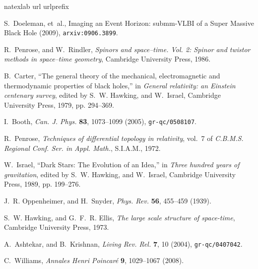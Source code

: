 \documentclass[
%
draft    %
,numberedheadings 
,bibliocites
  ]
  {aipproc}
\begin{document}
\begin{thebibliography}{57}
\expandafter\ifx\csname natexlab\endcsname\relax\def\natexlab#1{#1}\fi
\providecommand{\enquote}[1]{``#1''}
\expandafter\ifx\csname url\endcsname\relax
  \def\url#1{\texttt{#1}}\fi
\expandafter\ifx\csname urlprefix\endcsname\relax\def\urlprefix{URL }\fi
\providecommand{\eprint}[2][]{\url{#2}}

S.~Doeleman, et~al., {Imaging an Event Horizon: submm-VLBI of a Super Massive
  Black Hole} (2009), \eprint{arxiv:0906.3899}.

R.~Penrose, and W.~Rindler, \emph{{Spinors and space--time. Vol. 2: Spinor and
  twistor methods in space--time geometry}}, Cambridge University Press, 1986.

B.~Carter, \enquote{The general theory of the mechanical, electromagnetic and
  thermodynamic properties of black holes,} in \emph{General relativity: an
  Einstein centenary survey}, edited by S.~W. Hawking, and W.~Israel, Cambridge
  University Press, 1979, pp. 294--369.

I.~Booth, \emph{Can. J. Phys.} \textbf{83}, 1073--1099 (2005),
  \eprint{gr-qc/0508107}.

R.~Penrose, \emph{Techniques of differential topology in relativity}, vol.~7 of
  \emph{C.B.M.S. Regional Conf. Ser. in Appl. Math.}, S.I.A.M., 1972.

W.~Israel, \enquote{Dark Stars: The Evolution of an Idea,} in \emph{Three
  hundred years of gravitation}, edited by S.~W. Hawking, and W.~Israel,
  Cambridge University Press, 1989, pp. 199--276.

J.~R. Oppenheimer, and H.~Snyder, \emph{Phys. Rev.} \textbf{56}, 455--459
  (1939).

S.~W. Hawking, and G.~F.~R. Ellis, \emph{{The large scale structure of
  space-time}}, Cambridge University Press, 1973.

A.~Ashtekar, and B.~Krishnan, \emph{Living Rev. Rel.} \textbf{7}, 10 (2004),
  \eprint{gr-qc/0407042}.

C.~Williams, \emph{Annales Henri Poincar\'e} \textbf{9}, 1029--1067 (2008).


\end{thebibliography}
\end{document}
